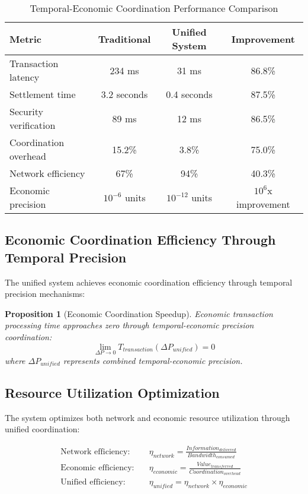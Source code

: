 \documentclass[12pt,a4paper]{article}
\newtheorem{proposition}[theorem]{Proposition}
\begin{document}
\begin{table}[H]
\centering
\caption{Temporal-Economic Coordination Performance Comparison}
\begin{tabular}{@{}lccc@{}}
\toprule
\textbf{Metric} & \textbf{Traditional} & \textbf{Unified System} & \textbf{Improvement} \\
\midrule
Transaction latency & 234 ms & 31 ms & 86.8\% \\
Settlement time & 3.2 seconds & 0.4 seconds & 87.5\% \\
Security verification & 89 ms & 12 ms & 86.5\% \\
Coordination overhead & 15.2\% & 3.8\% & 75.0\% \\
Network efficiency & 67\% & 94\% & 40.3\% \\
Economic precision & $10^{-6}$ units & $10^{-12}$ units & $10^{6}$x improvement \\
\bottomrule
\end{tabular}
\end{table}

\subsection{Economic Coordination Efficiency Through Temporal Precision}

The unified system achieves economic coordination efficiency through temporal precision mechanisms:

\begin{proposition}[Economic Coordination Speedup]
Economic transaction processing time approaches zero through temporal-economic precision coordination:
\begin{equation}
\lim_{\Delta P \rightarrow 0} T_{transaction}(\Delta P_{unified}) = 0
\end{equation}
where $\Delta P_{unified}$ represents combined temporal-economic precision.
\end{proposition}

\subsection{Resource Utilization Optimization}

The system optimizes both network and economic resource utilization through unified coordination:

\begin{align}
\text{Network efficiency:} \quad &\eta_{network} = \frac{Information_{delivered}}{Bandwidth_{consumed}} \\
\text{Economic efficiency:} \quad &\eta_{economic} = \frac{Value_{transferred}}{Coordination_{overhead}} \\
\text{Unified efficiency:} \quad &\eta_{unified} = \eta_{network} \times \eta_{economic}
\end{align}
\end{document}
